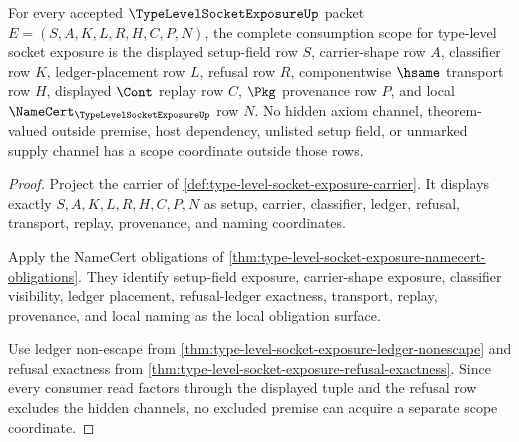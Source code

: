 \begin{theorem}
\label{thm:type-level-socket-exposure-scope-exactness}
For every accepted $\TypeLevelSocketExposureUp$ packet $E=(S,A,K,L,R,H,C,P,N)$, the complete consumption scope for type-level socket exposure is the displayed setup-field row $S$, carrier-shape row $A$, classifier row $K$, ledger-placement row $L$, refusal row $R$, componentwise $\hsame$ transport row $H$, displayed $\Cont$ replay row $C$, $\Pkg$ provenance row $P$, and local $\NameCert_{\TypeLevelSocketExposureUp}$ row $N$. No hidden axiom channel, theorem-valued outside premise, host dependency, unlisted setup field, or unmarked supply channel has a scope coordinate outside those rows.
\end{theorem}
\begin{proof}
Project the carrier of \autoref{def:type-level-socket-exposure-carrier}. It displays exactly $S,A,K,L,R,H,C,P,N$ as setup, carrier, classifier, ledger, refusal, transport, replay, provenance, and naming coordinates.

Apply the NameCert obligations of \autoref{thm:type-level-socket-exposure-namecert-obligations}. They identify setup-field exposure, carrier-shape exposure, classifier visibility, ledger placement, refusal-ledger exactness, transport, replay, provenance, and local naming as the local obligation surface.

Use ledger non-escape from \autoref{thm:type-level-socket-exposure-ledger-nonescape} and refusal exactness from \autoref{thm:type-level-socket-exposure-refusal-exactness}. Since every consumer read factors through the displayed tuple and the refusal row excludes the hidden channels, no excluded premise can acquire a separate scope coordinate.
\end{proof}

